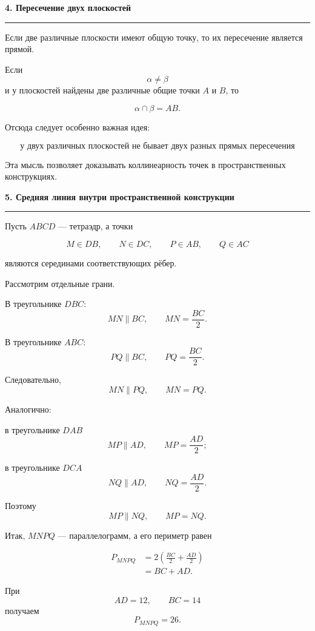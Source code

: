 \documentclass[a4paper,12pt]{article}
\newcommand{\lessonsection}[1]{%
  \vspace{0.4em}
  {\Large\bfseries\color{darkaccent}#1}\par
  \vspace{0.25em}
  {\color{lightaccent}\rule{\linewidth}{0.8pt}}
  \vspace{0.6em}
}
\begin{document}
\lessonsection{4. Пересечение двух плоскостей}

Если две различные плоскости имеют общую точку, то их пересечение является
прямой.

Если
\[
\alpha\ne\beta
\]
и у плоскостей найдены две различные общие точки \(A\) и \(B\), то

\[
\boxed{\alpha\cap\beta=AB}.
\]

Отсюда следует особенно важная идея:

\[
\boxed{\text{у двух различных плоскостей не бывает двух разных прямых пересечения}}
\]

Эта мысль позволяет доказывать коллинеарность точек в пространственных
конструкциях.

\lessonsection{5. Средняя линия внутри пространственной конструкции}

Пусть \(ABCD\) --- тетраэдр, а точки

\[
M\in DB,\qquad
N\in DC,\qquad
P\in AB,\qquad
Q\in AC
\]

являются серединами соответствующих рёбер.

Рассмотрим отдельные грани.

В треугольнике \(DBC\):
\[
MN\parallel BC,\qquad MN=\frac{BC}{2}.
\]

В треугольнике \(ABC\):
\[
PQ\parallel BC,\qquad PQ=\frac{BC}{2}.
\]

Следовательно,
\[
MN\parallel PQ,\qquad MN=PQ.
\]

Аналогично:

в треугольнике \(DAB\)
\[
MP\parallel AD,\qquad MP=\frac{AD}{2};
\]

в треугольнике \(DCA\)
\[
NQ\parallel AD,\qquad NQ=\frac{AD}{2}.
\]

Поэтому
\[
MP\parallel NQ,\qquad MP=NQ.
\]

Итак, \(MNPQ\) --- параллелограмм, а его периметр равен

\[
\begin{aligned}
P_{MNPQ}
&=
2\left(\frac{BC}{2}+\frac{AD}{2}\right)\\
&=BC+AD.
\end{aligned}
\]

При
\[
AD=12,\qquad BC=14
\]
получаем
\[
\boxed{P_{MNPQ}=26}.
\]
\end{document}
